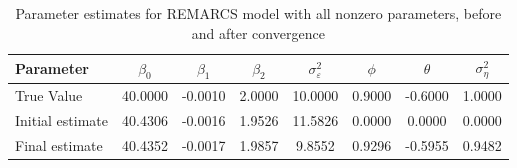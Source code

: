 \begin{table}[H]
\centering\begin{tabular}{lccccccc}
\toprule
Parameter & $\beta_0$ & $\beta_1$ & $\beta_2$ & $\sigma_\varepsilon^2$ & $\phi$ & $\theta$ & $\sigma_\eta^2$ \\
\midrule
True Value & 40.0000 & -0.0010 & 2.0000 & 10.0000 & 0.9000 & -0.6000 & 1.0000 \\
\midrule
Initial estimate & 40.4306 & -0.0016 & 1.9526 & 11.5826 & 0.0000 & 0.0000 & 0.0000 \\
Final estimate & 40.4352 & -0.0017 & 1.9857 & 9.8552 & 0.9296 & -0.5955 & 0.9482 \\
\hline
\end{tabular}
\caption{Parameter estimates for REMARCS model with all nonzero parameters, before and after convergence}
\label{tab:param_estimates}
\end{table}

